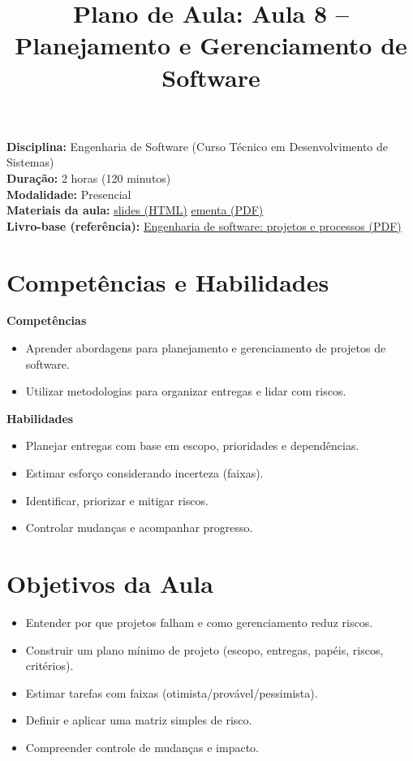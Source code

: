 \documentclass[12pt,a4paper]{article}
\title{Plano de Aula: Aula 8 -- Planejamento e Gerenciamento de Software}
\date{}
\begin{document}
\maketitle

\noindent
\textbf{Disciplina:} Engenharia de Software (Curso Técnico em Desenvolvimento de Sistemas)\\
\textbf{Duração:} 2 horas (120 minutos)\\
\textbf{Modalidade:} Presencial\\
\textbf{Materiais da aula:} \href{aula-08.html}{slides (HTML)} \quad \href{aula-08.pdf}{ementa (PDF)}\\
\textbf{Livro-base (referência):} \href{../99-Materiais/Engenharia%20de%20software%20projetos%20e%20processos%20by%20Wilson%20de%20P%C3%A1dua%20Paula%20Filho%20.epub.pdf}{Engenharia de software: projetos e processos (PDF)}

\section{Competências e Habilidades}
\textbf{Competências}
\begin{itemize}[leftmargin=*,itemsep=0.25em]
  \item Aprender abordagens para planejamento e gerenciamento de projetos de software.
  \item Utilizar metodologias para organizar entregas e lidar com riscos.
\end{itemize}

\textbf{Habilidades}
\begin{itemize}[leftmargin=*,itemsep=0.25em]
  \item Planejar entregas com base em escopo, prioridades e dependências.
  \item Estimar esforço considerando incerteza (faixas).
  \item Identificar, priorizar e mitigar riscos.
  \item Controlar mudanças e acompanhar progresso.
\end{itemize}

\section{Objetivos da Aula}
\begin{itemize}[leftmargin=*,itemsep=0.25em]
  \item Entender por que projetos falham e como gerenciamento reduz riscos.
  \item Construir um plano mínimo de projeto (escopo, entregas, papéis, riscos, critérios).
  \item Estimar tarefas com faixas (otimista/provável/pessimista).
  \item Definir e aplicar uma matriz simples de risco.
  \item Compreender controle de mudanças e impacto.
\end{itemize}
\end{document}
